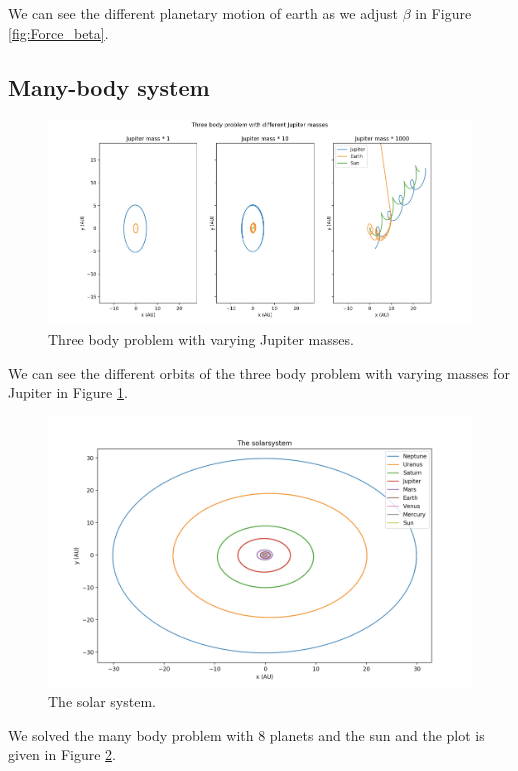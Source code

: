 \documentclass{article}
\begin{document}
\begin{multicols}{2}
We can see the different planetary motion of earth as we adjust $\beta$ in Figure \ref{fig:Force_beta}.


\subsection{Many-body system}

\begin{figure}[H]
	\centering
	\includegraphics[width=\linewidth]{Jup_mass}
	\caption{Three body problem with varying Jupiter masses.}
	\label{fig:Jup_mass}
\end{figure}

We can see the different orbits of the three body problem with varying masses for Jupiter in Figure \ref{fig:Jup_mass}. 

\begin{figure}[H]
	\centering
	\includegraphics[width=\linewidth]{Solar}
	\caption{The solar system.}
	\label{fig:Solar}
\end{figure}

We solved the many body problem with 8 planets and the sun and the plot is given in Figure \ref{fig:Solar}. 


\end{multicols}
\end{document}
